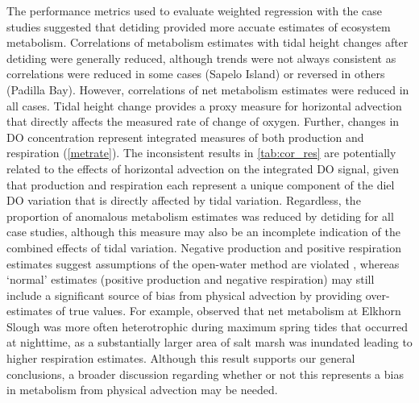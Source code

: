 \documentclass[letterpaper,12pt,oneside]{article}\usepackage[]{graphicx}\usepackage[]{color}
\begin{document}
The performance metrics used to evaluate weighted regression with the case studies suggested that detiding provided more accuate estimates of ecosystem metabolism.  Correlations of metabolism estimates with tidal height changes after detiding were generally reduced, although trends were not always consistent as correlations were reduced in some cases (Sapelo Island) or reversed in others (Padilla Bay).  However, correlations of net metabolism estimates were reduced in all cases.  Tidal height change provides a proxy measure for horizontal advection that directly affects the measured rate of change of oxygen.  Further, changes in \ac{DO} concentration represent integrated measures of both production and respiration (\cref{metrate}).  The inconsistent results in \cref{tab:cor_res} are potentially related to the effects of horizontal advection on the integrated \ac{DO} signal, given that production and respiration each represent a unique component of the diel \ac{DO} variation that is directly affected by tidal variation.  Regardless, the proportion of anomalous metabolism estimates was reduced by detiding for all case studies, although this measure may also be an incomplete indication of the combined effects of tidal variation.  Negative production and positive respiration estimates suggest assumptions of the open-water method are violated \citep{Needoba12}, whereas `normal' estimates (positive production and negative respiration) may still include a significant source of bias from physical advection by providing over-estimates of true values.  For example, \citet{Nidzieko14} observed that net metabolism at Elkhorn Slough was more often heterotrophic during maximum spring tides that occurred at nighttime, as a substantially larger area of salt marsh was inundated leading to higher respiration estimates.  Although this result supports our general conclusions, a broader discussion regarding whether or not this represents a bias in metabolism from physical advection may be needed. 
\end{document}
